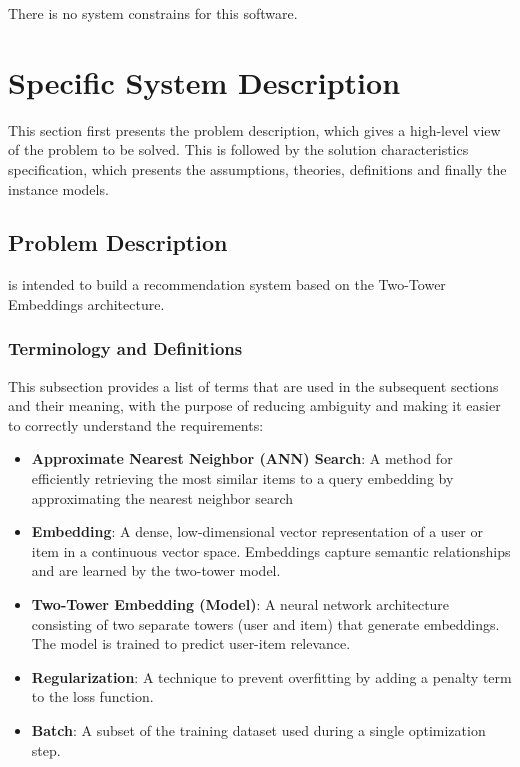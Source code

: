 \documentclass[12pt]{article}
\begin{document}
There is no system constrains for this software.

\section{Specific System Description}

This section first presents the problem description, which gives a high-level
view of the problem to be solved.  This is followed by the solution characteristics
specification, which presents the assumptions, theories, definitions and finally
the instance models. 

\subsection{Problem Description} \label{Sec_pd}

\progname{} is intended to build a recommendation system based on the Two-Tower Embeddings architecture.


\subsubsection{Terminology and  Definitions}

This subsection provides a list of terms that are used in the subsequent
sections and their meaning, with the purpose of reducing ambiguity and making it
easier to correctly understand the requirements:

\begin{itemize}

  \item \textbf{Approximate Nearest Neighbor (ANN) Search}: A method for efficiently retrieving the most similar items to a query embedding by approximating the nearest neighbor search
  \item \textbf{Embedding}: A dense, low-dimensional vector representation of a user or item in a continuous vector space. Embeddings capture semantic relationships and are learned by the two-tower model.
  \item \textbf{Two-Tower Embedding (Model)}: A neural network architecture consisting of two separate towers (user and item) that generate embeddings. The model is trained to predict user-item relevance.
  \item \textbf{Regularization}: A technique to prevent overfitting by adding a penalty term to the loss function.
  \item  \textbf{Batch}: A subset of the training dataset used during a single optimization step.

\end{itemize}
\end{document}
